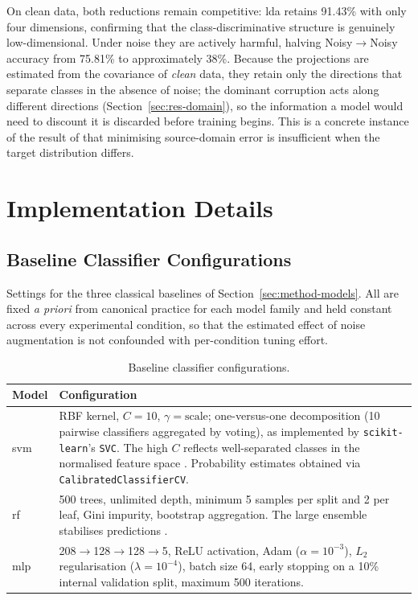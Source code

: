 On clean data, both reductions remain competitive: \gls{lda} retains 91.43\% with only four dimensions, confirming that the class-discriminative structure is genuinely low-dimensional. Under noise they are actively harmful, halving Noisy$\to$Noisy accuracy from 75.81\% to approximately 38\%. Because the projections are estimated from the covariance of \emph{clean} data, they retain only the directions that separate classes in the absence of noise; the dominant corruption acts along different directions (Section~\ref{sec:res-domain}), so the information a model would need to discount it is discarded before training begins. This is a concrete instance of the result of \textcite{ben-david2010domain} that minimising source-domain error is insufficient when the target distribution differs.

\chapter{Implementation Details}
\label{app:implementation}

\section{Baseline Classifier Configurations}
\label{app:baselines}

Settings for the three classical baselines of Section~\ref{sec:method-models}. All are fixed \emph{a priori} from canonical practice for each model family and held constant across every experimental condition, so that the estimated effect of noise augmentation is not confounded with per-condition tuning effort.

\begin{table}[htbp]
\centering
\caption[Baseline classifier configurations]{Baseline classifier configurations.}
\label{tab:baseline-params}
\small
\begin{tabularx}{\textwidth}{@{}lX@{}}
\toprule
\textbf{Model} & \textbf{Configuration} \\
\midrule
\gls{svm} & RBF kernel, $C = 10$, $\gamma = \text{scale}$; one-versus-one decomposition (10 pairwise classifiers aggregated by voting), as implemented by \texttt{scikit-learn}'s \texttt{SVC}. The high $C$ reflects well-separated classes in the normalised feature space \parencite{cortes1995}. Probability estimates obtained via \texttt{CalibratedClassifierCV}. \\
\midrule
\gls{rf} & 500 trees, unlimited depth, minimum 5 samples per split and 2 per leaf, Gini impurity, bootstrap aggregation. The large ensemble stabilises predictions \parencite{breiman2001}. \\
\midrule
\gls{mlp} & 208$\rightarrow$128$\rightarrow$128$\rightarrow$5, ReLU activation, Adam ($\alpha = 10^{-3}$), $L_2$ regularisation ($\lambda = 10^{-4}$), batch size 64, early stopping on a 10\% internal validation split, maximum 500 iterations. \\
\bottomrule
\end{tabularx}
\end{table}

